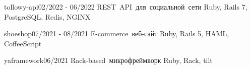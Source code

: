 
\begin{minipage}[t]{\dimexpr(\linewidth/3) - 3em}
\begin{projects}
   \projectoneline
      {tollowy-api}{02/2022 - 06/2022}
      {}
      {\hbox{REST API для социальной сети}}
      {Ruby, Rails 7, PostgreSQL, Redis, NGINX}
\end{projects}
\end{minipage}
\hfill
\begin{minipage}[t]{\dimexpr(\linewidth/3) - 3em}
\begin{projects}
   \projectoneline
      {shoeshop}{07/2021 - 08/2021}
      {}
      {\hbox{E-commerce веб-сайт}}
      {Ruby, Rails 5, HAML, CoffeeScript}
   \end{projects}
\end{minipage}
\hfill
\begin{minipage}[t]{\dimexpr(\linewidth/3) - 3em}
\begin{projects}
   \projectoneline
      {yaframework}{06/2021}
      {}
      {\hbox{Rack-based микрофреймворк}}
      {Ruby, Rack, tilt}
   \end{projects}
\end{minipage}
